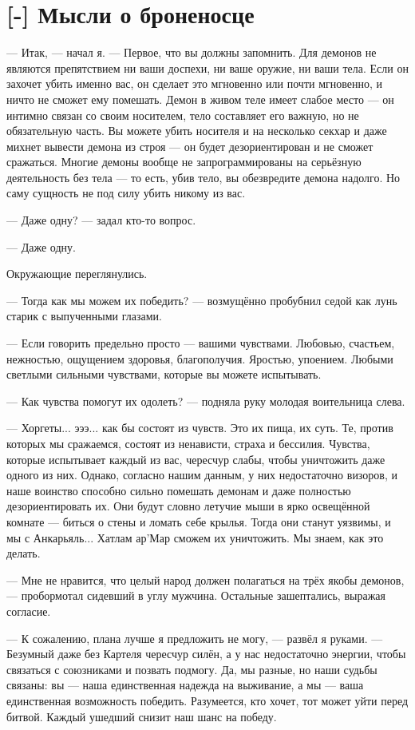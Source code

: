 \section{[-] Мысли о броненосце}

\textspace

--- Итак, --- начал я.
--- Первое, что вы должны запомнить.
Для демонов не являются препятствием ни ваши доспехи, ни ваше оружие, ни ваши тела.
Если он захочет убить именно вас, он сделает это мгновенно или почти мгновенно, и ничто не сможет ему помешать.
Демон в живом теле имеет слабое место --- он интимно связан со своим носителем, тело составляет его важную, но не обязательную часть.
Вы можете убить носителя и на несколько секхар и даже михнет вывести демона из строя --- он будет дезориентирован и не сможет сражаться.
Многие демоны вообще не запрограммированы на серьёзную деятельность без тела --- то есть, убив тело, вы обезвредите демона надолго.
Но саму сущность не под силу убить никому из вас.

--- Даже одну? --- задал кто-то вопрос.

--- Даже одну.

Окружающие переглянулись.

--- Тогда как мы можем их победить? --- возмущённо пробубнил седой как лунь старик с выпученными глазами.

--- Если говорить предельно просто --- вашими чувствами.
Любовью, счастьем, нежностью, ощущением здоровья, благополучия.
Яростью, упоением.
Любыми светлыми сильными чувствами, которые вы можете испытывать.

--- Как чувства помогут их одолеть? --- подняла руку молодая воительница слева.

--- Хоргеты... эээ... как бы состоят из чувств.
Это их пища, их суть.
Те, против которых мы сражаемся, состоят из ненависти, страха и бессилия.
Чувства, которые испытывает каждый из вас, чересчур слабы, чтобы уничтожить даже одного из них.
Однако, согласно нашим данным, у них недостаточно визоров, и наше воинство способно сильно помешать демонам и даже полностью дезориентировать их.
Они будут словно летучие мыши в ярко освещённой комнате --- биться о стены и ломать себе крылья.
Тогда они станут уязвимы, и мы с Анкарьяль... Хатлам ар’Мар сможем их уничтожить.
Мы знаем, как это делать.

--- Мне не нравится, что целый народ должен полагаться на трёх якобы демонов, --- пробормотал сидевший в углу мужчина.
Остальные зашептались, выражая согласие.

--- К сожалению, плана лучше я предложить не могу, --- развёл я руками.
--- Безумный даже без Картеля чересчур силён, а у нас недостаточно энергии, чтобы связаться с союзниками и позвать подмогу.
Да, мы разные, но наши судьбы связаны: вы --- наша единственная надежда на выживание, а мы --- ваша единственная возможность победить.
Разумеется, кто хочет, тот может уйти перед битвой.
Каждый ушедший снизит наш шанс на победу.

